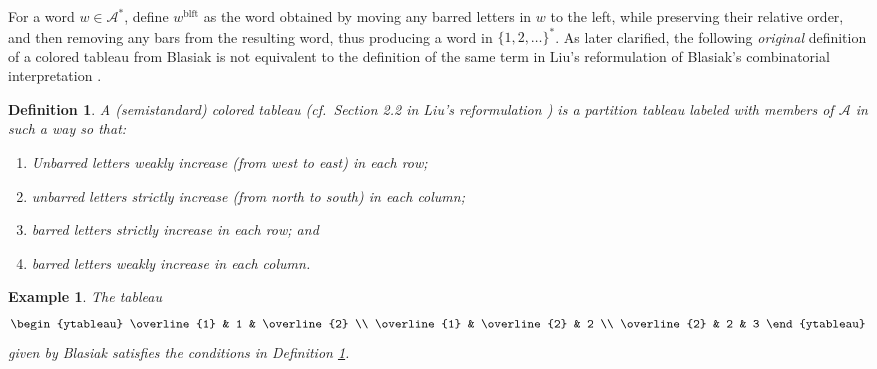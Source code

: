 \documentclass[12pt]{article}
\newtheorem{definition}{Definition}
\newtheorem{example}{Example}
\begin{document}
 For a word $w \in \mathcal{A}^{\ast}$, define $w^{\operatorname{blft}}$ as the word obtained by moving any barred letters in $w$ 
 to the left, while preserving their relative order, and then removing any bars from the resulting word, thus producing a word 
 in $\{ 1, 2, \ldots \}^{\ast}$. As later clarified, the following \emph{original} definition of a colored tableau from Blasiak 
 \cite{Blasiak20162018} is not equivalent to the definition of the same term in Liu's reformulation of Blasiak's 
 combinatorial interpretation \cite{Liu2017}. 

\begin{definition}\label{coloredBlasiak}
 A \emph{(semistandard) colored tableau} \cite{Blasiak20162018} (cf.\ Section 2.2 in Liu's reformulation \cite{Liu2017}) is a partition 
 tableau labeled with members of $\mathcal{A}$ in such a way so that: 

\begin{enumerate}

\item Unbarred letters weakly increase (from west to east) in each row;

\item unbarred letters strictly increase (from north to south) in each column;

\item barred letters strictly increase in each row; and

\item barred letters weakly increase in each column.

\end{enumerate}
\end{definition}

\begin{example}
 The tableau
\begin{equation}\label{excoloredBlasiak}
 \begin{ytableau}
 \overline{1} & 1 & \overline{2} \\
 \overline{1} & \overline{2} & 2 \\
 \overline{2} & 2 & 3 
\end{ytableau}
\end{equation}
 given by Blasiak \cite{Blasiak20162018} satisfies the conditions in Definition \ref{coloredBlasiak}. 
\end{example}
\end{document}
